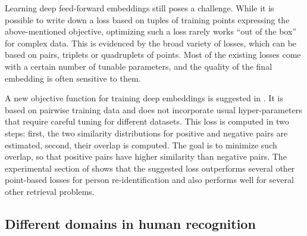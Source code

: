 
Learning deep feed-forward embeddings still poses a challenge. While it is possible to write down a loss based on tuples of training points expressing the above-mentioned objective, optimizing such a loss rarely works ``out of the box'' for complex data. This is evidenced by the broad variety of losses, which can be based on pairs, triplets or quadruplets of points.  Most of the existing losses come with a certain number of tunable parameters, and the quality of the final embedding is often sensitive to them.%


A new objective function for training deep embeddings is suggested in . It is based on pairwise training data and does not incorporate usual hyper-parameters that require careful tuning for different datasets.   %
This loss is computed in two steps: first, the two similarity distributions for positive and negative pairs are estimated, second, their overlap is computed. The goal is to minimize such overlap, so that positive pairs have higher similarity than negative pairs. The experimental section of  shows that the suggested loss outperforms several other point-based losses for person re-identification and also performs well for several other retrieval problems. 


\subsection{Different domains in human recognition}


